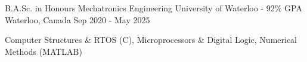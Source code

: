 

\begin{cventries}

  \cventry
    {B.A.Sc. in Honours Mechatronics Engineering} %
    {University of Waterloo - 92\% GPA} %
    {Waterloo, Canada} %
    {Sep 2020 - May 2025} %
    {
      \begin{cvitems}
        \item{Computer Structures \& RTOS (C), Microprocessors \& Digital Logic, Numerical Methods (MATLAB)}
      \end{cvitems}
    }
\end{cventries}
